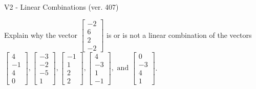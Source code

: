 \begin{exercise}
  \begin{exerciseTitle}V2 - Linear Combinations (ver. 407)\end{exerciseTitle}
  \begin{exerciseStatement}
    Explain why the vector \(\left[\begin{array}{c}
-2 \\
6 \\
2 \\
-2
\end{array}\right]\)  is or is not a linear 
	combination of the vectors \(\left[\begin{array}{c}
4 \\
-1 \\
4 \\
0
\end{array}\right] , \left[\begin{array}{c}
-3 \\
-2 \\
-5 \\
1
\end{array}\right] , \left[\begin{array}{c}
-1 \\
1 \\
2 \\
2
\end{array}\right] , \left[\begin{array}{c}
4 \\
-3 \\
1 \\
-1
\end{array}\right] , \text{ and } \left[\begin{array}{c}
0 \\
-3 \\
4 \\
1
\end{array}\right]\).
	



\end{exerciseStatement}
\end{exercise}
